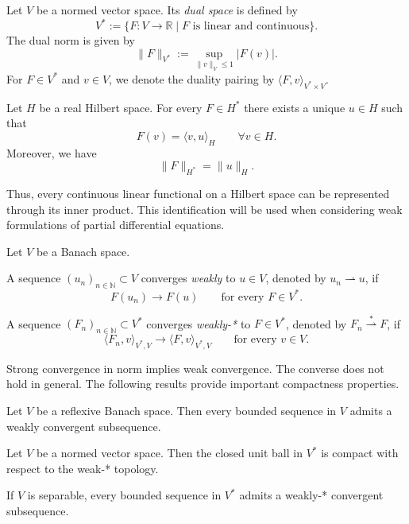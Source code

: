 \begin{definition}
    Let $V$ be a normed vector space. Its
    \emph{dual space} is defined by
    \[
        V^*:=\{F:V\to\mathbb{R}
        \mid F\text{ is linear and continuous}\}.
    \]
    The dual norm is given by
    \[
        \|F\|_{V^*}
        :=\sup_{\|v\|_V\leq 1}|F(v)|.
    \]
    For $F\in V^*$ and $v\in V$, we denote
    the duality pairing by
    $\langle F,v\rangle_{V^*\times V}$.
\end{definition}
\begin{theorem}
	Let $H$ be a real Hilbert space. For every $F\in H^*$ there exists a unique $u\in H$ such that
	$$
	F(v) = \langle v,u\rangle_H \qquad \forall v\in H.
	$$
	Moreover, we have 
	$$
	\|F\|_{H^*} = \|u\|_H.
	$$
\end{theorem}
Thus, every continuous linear functional on a Hilbert space can be represented through its inner product.
This identification will be used when considering
weak formulations of partial differential equations.


\begin{definition}
    Let $V$ be a Banach space.

    A sequence $(u_n)_{n\in\mathbb{N}}\subset V$
    converges \emph{weakly} to $u\in V$,
    denoted by $u_n\rightharpoonup u$, if
    \[
        F(u_n)\longrightarrow F(u)
        \qquad\text{for every }F\in V^*.
    \]

    A sequence $(F_n)_{n\in\mathbb{N}}\subset V^*$
    converges \emph{weakly-*} to $F\in V^*$,
    denoted by $F_n\overset{*}{\rightharpoonup}F$,
    if
    \[
        \langle F_n,v\rangle_{V^*,V}
        \longrightarrow
        \langle F,v\rangle_{V^*,V}
        \qquad\text{for every }v\in V.
    \]
\end{definition}

Strong convergence in norm implies weak
convergence. The converse does not hold in
general. The following results provide
important compactness properties.

\begin{theorem}
    Let $V$ be a reflexive Banach space.
    Then every bounded sequence in $V$
    admits a weakly convergent subsequence.
\end{theorem}

\begin{theorem}
    Let $V$ be a normed vector space. Then
    the closed unit ball in $V^*$ is compact
    with respect to the weak-* topology.

    If $V$ is separable, every bounded
    sequence in $V^*$ admits a weakly-*
    convergent subsequence.
\end{theorem}

